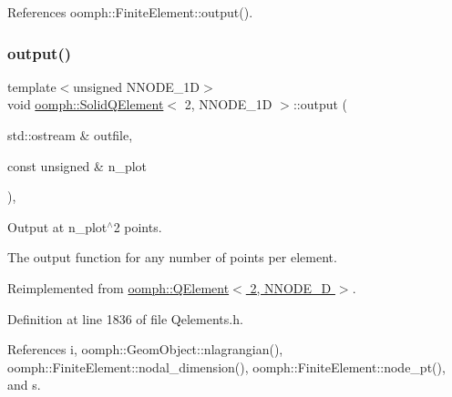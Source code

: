 References oomph\+::\+Finite\+Element\+::output().

\mbox{\label{classoomph_1_1SolidQElement_3_012_00_01NNODE__1D_01_4_abf15749cc9224e1412d3f404e20b69e4}} 
\subsubsection{\texorpdfstring{output()}{output()}\hspace{0.1cm}{\footnotesize\ttfamily [2/4]}}
{\footnotesize\ttfamily template$<$unsigned N\+N\+O\+D\+E\+\_\+1D$>$ \\
void \hyperlink{classoomph_1_1SolidQElement}{oomph\+::\+Solid\+Q\+Element}$<$ 2, N\+N\+O\+D\+E\+\_\+1D $>$\+::output (\begin{DoxyParamCaption}\item[{std\+::ostream \&}]{outfile,  }\item[{const unsigned \&}]{n\+\_\+plot }\end{DoxyParamCaption})\hspace{0.3cm}{\ttfamily [inline]}, {\ttfamily [virtual]}}



Output at n\+\_\+plot$^\wedge$2 points. 

The output function for any number of points per element. 

Reimplemented from \hyperlink{classoomph_1_1QElement_3_012_00_01NNODE__1D_01_4_a865e3a77ee4cb67e7fcd7eca42d256f1}{oomph\+::\+Q\+Element$<$ 2, N\+N\+O\+D\+E\+\_\+D $>$}.



Definition at line 1836 of file Qelements.\+h.



References i, oomph\+::\+Geom\+Object\+::nlagrangian(), oomph\+::\+Finite\+Element\+::nodal\+\_\+dimension(), oomph\+::\+Finite\+Element\+::node\+\_\+pt(), and s.

\mbox{\label{classoomph_1_1SolidQElement_3_012_00_01NNODE__1D_01_4_a14c6010937dc14338a3b8eb4f5ab8bb6}} 
